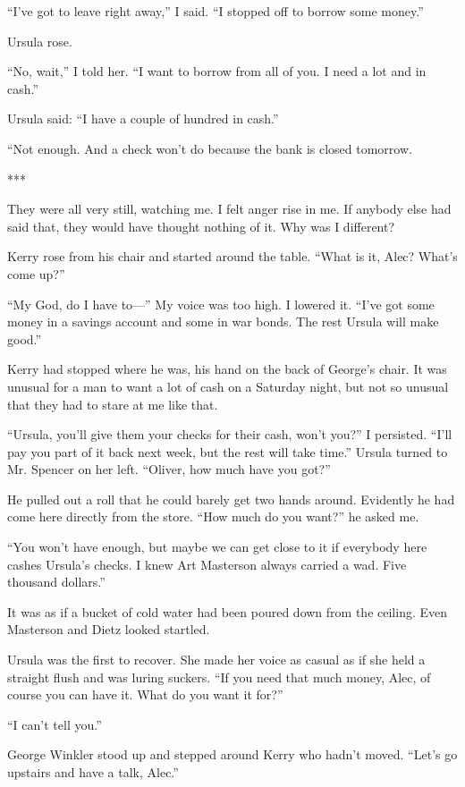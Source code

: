 {“I’ve got to leave right away,” I said. “I stopped off to borrow some money.”

Ursula rose.

“No, wait,” I told her. “I want to borrow from all of you. I need a lot and in cash.”

Ursula said: “I have a couple of hundred in cash.”

“Not enough. And a check won’t do because the bank is closed tomorrow.

***

They were all very still, watching me. I felt anger rise in me. If anybody else had said that, they would have thought nothing of it. Why was I different?

Kerry rose from his chair and started around the table. “What is it, Alec? What’s come up?”

“My God, do I have to—” My voice was too high. I lowered it. “I’ve got some money in a savings account and some in war bonds. The rest Ursula will make good.”

Kerry had stopped where he was, his hand on the back of George’s chair. It was unusual for a man to want a lot of cash on a Saturday night, but not so unusual that they had to stare at me like that.

“Ursula, you’ll give them your checks for their cash, won’t you?” I persisted. “I’ll pay you part of it back next week, but the rest will take time.” Ursula turned to Mr. Spencer on her left. “Oliver, how much have you got?”

He pulled out a roll that he could barely get two hands around. Evidently he had come here directly from the store. “How much do you want?” he asked me.

“You won’t have enough, but maybe we can get close to it if everybody here cashes Ursula’s checks. I knew Art Masterson always carried a wad. Five thousand dollars.”

It was as if a bucket of cold water had been poured down from the ceiling. Even Masterson and Dietz looked startled.

Ursula was the first to recover. She made her voice as casual as if she held a straight flush and was luring suckers. “If you need that much money, Alec, of course you can have it. What do you want it for?”

“I can’t tell you.”

George Winkler stood up and stepped around Kerry who hadn’t moved. “Let’s go upstairs and have a talk, Alec.”

}
